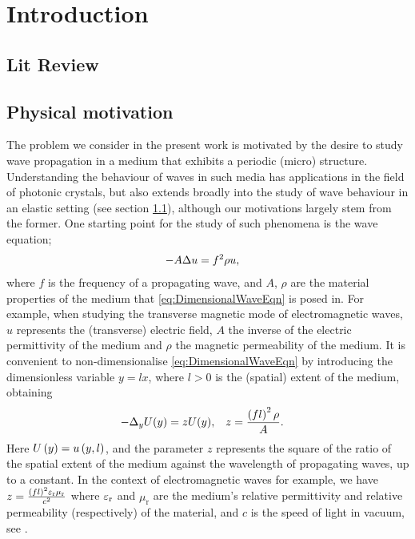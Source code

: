 \section{Introduction} \label{sec:Intro}


\subsection{Lit Review} \label{ssec:LitReview}

\subsection{Physical motivation} \label{ssec:PhysMot}
The problem we consider in the present work is motivated by the desire to study wave propagation in a medium that exhibits a periodic (micro) structure.
Understanding the behaviour of waves in such media has applications in the field of photonic crystals, but also extends broadly into the study of wave behaviour in an elastic setting (see section \ref{ssec:LitReview}), although our motivations largely stem from the former.
One starting point for the study of such phenomena is the wave equation;
\begin{align} \label{eq:DimensionalWaveEqn}
	-A \Delta u &= f^2 \rho u,
\end{align}
where $f$ is the frequency of a propagating wave, and $A$, $\rho$ are the material properties of the medium that \eqref{eq:DimensionalWaveEqn} is posed in.
For example, when studying the transverse magnetic mode of electromagnetic waves, $u$ represents the (transverse) electric field, $A$ the inverse of the electric permittivity of the medium and $\rho$ the magnetic permeability of the medium.
It is convenient to non-dimensionalise \eqref{eq:DimensionalWaveEqn} by introducing the dimensionless variable $y=lx$, where $l>0$ is the (spatial) extent of the medium, obtaining
\begin{align} \label{eq:NonDimensionalWaveEqn}
	-\Delta_{y} U(y) = z U(y), &\quad z = \frac{\left( fl \right)^2 \rho }{A}.
\end{align}
Here $U\left( y \right) = u\left( y,l \right)$, and the parameter $z$ represents the square of the ratio of the spatial extent of the medium against the wavelength of propagating waves, up to a constant.
In the context of electromagnetic waves for example, we have $z = \frac{\left( fl \right)^2 \varepsilon_\mathrm{r}\mu_\mathrm{r}}{c^2}$ where $\varepsilon_\mathrm{r}$ and $\mu_\mathrm{r}$ are the medium's relative permittivity and relative permeability (respectively) of the material, and $c$ is the speed of light in vacuum, see \cite{jackson1999classical, cessenat1996mathematical}.

